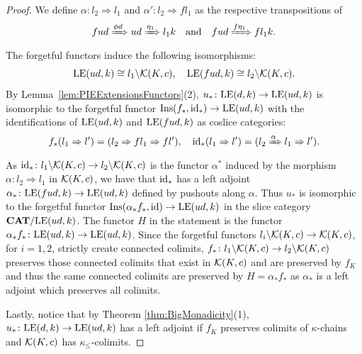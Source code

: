 \begin{proof}
We define $\alpha\colon l_2\Rightarrow l_1$ and $\alpha'\colon l_2\Rightarrow fl_1$ as the respective transpositions of
\[
fud\xRightarrow{\phi d} ud\xRightarrow{\eta_1}l_1k \quad \text{and}\quad fud\xRightarrow{f\eta_1}fl_1k.
\]
The forgetful functors induce the following isomorphisms: 
$$
\mathrm{LE}(ud,k)\cong l_1\backslash\mathcal{K}(K,c), \quad \mathrm{LE}(fud,k)\cong l_2\backslash\mathcal{K}(K,c).
$$
By Lemma~\ref{lem:PIEExtensionsFunctors}(2), $u_*\colon \mathrm{LE}(d,k)\to \mathrm{LE}(ud,k)$ is isomorphic to the forgetful functor $\mathrm{Ins}(f_*,\mathrm{id}_*)\to \mathrm{LE}(ud,k)$ with the identifications of $\mathrm{LE}(ud,k)$ and $\mathrm{LE}(fud,k)$ as coslice categories:
$$
f_*(l_1\Rightarrow l') = (l_2\Rightarrow fl_1\Rightarrow fl'),\quad \mathrm{id}_*(l_1\Rightarrow l')= (l_2\xRightarrow{\alpha} l_1\Rightarrow l').
$$
As $\mathrm{id}_*\colon l_1\backslash\mathcal{K}(K,c)\to l_2\backslash\mathcal{K}(K,c)$ is the functor $\alpha^*$ induced by the morphism $\alpha\colon l_2\Rightarrow l_1$ in $\mathcal{K}(K,c)$, we have that $\mathrm{id}_*$ has a left adjoint $\alpha_*\colon \mathrm{LE}(fud,k)\to \mathrm{LE}(ud,k)$ defined by pushouts along $\alpha$. Thus $u_*$ is isomorphic to the forgetful functor $\mathrm{Ins}(\alpha_*f_*,\mathrm{id})\to \mathrm{LE}(ud,k)$ in the slice category $\mathbf{CAT}/\mathrm{LE}(ud,k)$. The functor $H$ in the statement is the functor $\alpha_*f_*\colon \mathrm{LE}(ud,k)\to \mathrm{LE}(ud,k)$. Since the forgetful functors $l_i\backslash \mathcal{K}(K,c)\to \mathcal{K}(K,c)$, for $i = 1,2$, strictly create connected colimits, $f_*\colon l_1\backslash\mathcal{K}(K,c)\to l_2\backslash \mathcal{K}(K,c)$ preserves those connected colimits that exist in $\mathcal{K}(K,c)$ and are preserved by $f_K$ and thus the same connected colimits are preserved by $H=\alpha_*f_*$ as $\alpha_*$ is a left adjoint which preserves all colimits. 

Lastly, notice that by Theorem \ref{thm:BigMonadicity}(1), $u_*\colon\mathrm{LE}(d,k)\to \mathrm{LE}(ud,k)$ has a left adjoint if $f_K$ preserves colimits of $\kappa$-chains and $\mathcal{K}(K,c)$ has $\kappa_\leq$-colimits.
\end{proof}


